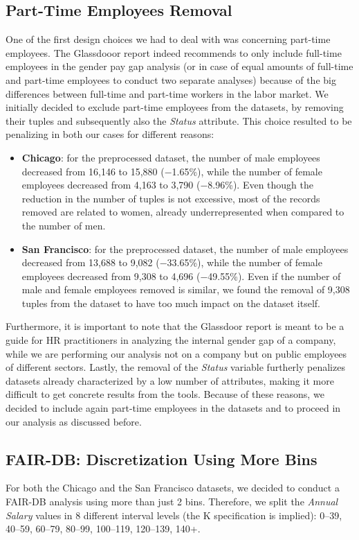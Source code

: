 \subsection{Part-Time Employees Removal}
One of the first design choices we had to deal with was concerning part-time employees. The Glassdooor report \cite{chamberlain2017analyze} indeed recommends to only include full-time employees in the gender pay gap analysis (or in case of equal amounts of full-time and part-time employees to conduct two separate analyses) because of the big differences between full-time and part-time workers in the labor market. We initially decided to exclude part-time employees from the datasets, by removing their tuples and subsequently also the \textit{Status} attribute. This choice resulted to be penalizing in both our cases for different reasons:
\begin{itemize}
\item \textbf{Chicago}: for the preprocessed dataset, the number of male employees decreased from 16,146 to 15,880 (\(-\)1.65\%), while the number of female employees decreased from 4,163 to 3,790 (\(-\)8.96\%). Even though the reduction in the number of tuples is not excessive, most of the records removed are related to women, already underrepresented when compared to the number of men.
\item \textbf{San Francisco}: for the preprocessed dataset, the number of male employees decreased from 13,688 to 9,082 (\(-\)33.65\%), while the number of female employees decreased from 9,308 to 4,696 (\(-\)49.55\%). Even if the number of male and female employees removed is similar, we found the removal of 9,308 tuples from the dataset to have too much impact on the dataset itself.
\end{itemize}
Furthermore, it is important to note that the Glassdoor report is meant to be a guide for HR practitioners in analyzing the internal gender gap of a company, while we are performing our analysis not on a company but on public employees of different sectors. Lastly, the removal of the \textit{Status} variable furtherly penalizes datasets already characterized by a low number of attributes, making it more difficult to get concrete results from the tools. Because of these reasons, we decided to include again part-time employees in the datasets and to proceed in our analysis as discussed before.


\subsection{FAIR-DB: Discretization Using More Bins}
For both the Chicago and the San Francisco datasets, we decided to conduct a FAIR-DB analysis using more than just 2 bins. Therefore, we split the \textit{Annual Salary} values in 8 different interval levels (the K specification is implied): 0--39, 40--59, 60--79, 80--99, 100--119, 120--139, 140+.

